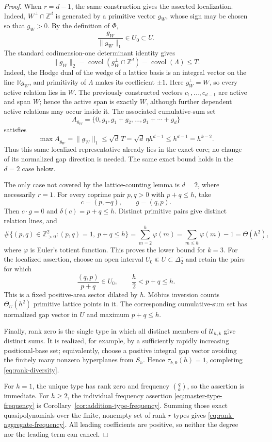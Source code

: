 \documentclass[11pt,reqno]{amsart}
\theoremstyle{definition}
\theoremstyle{remark}
\begin{document}
\begin{proof}
When $r=d-1$, the same construction gives the asserted localization.
Indeed, $W^\perp\cap\mathbb Z^d$ is generated by a primitive vector
$g_W$, whose sign may be chosen so that $g_W>0$. By the definition of
$\Phi$,
\[
 \frac{g_W}{\|g_W\|_1}\in U_0\subset U.
\]
The standard
codimension-one determinant identity gives
\[
 \|g_W\|_2
 =\operatorname{covol}(g_W^\perp\cap\mathbb Z^d)
 =\operatorname{covol}(\Lambda)\leq T.
\]
Indeed, the Hodge dual of the wedge of a lattice basis is an integral
vector on the line $\mathbb Rg_W$, and primitivity of $\Lambda$ makes its
coefficient $\pm1$.
Here $g_W^\perp=W$, so every active relation lies in $W$.  The previously
constructed vectors $c_1,\ldots,c_{d-1}$ are active and span $W$; hence the
active span is exactly $W$, although further dependent active relations may
occur inside it.  The
associated cumulative-sum set
\[
 A_{g_W}=\{0,g_1,g_1+g_2,\ldots,g_1+\cdots+g_d\}
\]
satisfies
\[
 \max A_{g_W}=\|g_W\|_1
 \leq\sqrt d\,T
 =\sqrt d\,\eta h^{d-1}\leq h^{d-1}=h^{k-2}.
\]
Thus this same localized representative already lies in the exact core; no
change of its normalized gap direction is needed.  The same exact bound
holds in the $d=2$ case below.

The only case not covered by the lattice-counting lemma is $d=2$, where
necessarily $r=1$. For every coprime pair $p,q>0$ with $p+q\leq h$, take
\[
 c=(p,-q),\qquad g=(q,p).
\]
Then $c\cdot g=0$ and $\delta(c)=p+q\leq h$. Distinct primitive pairs give
distinct relation lines, and
\[
 \#\{(p,q)\in\mathbb Z_{>0}^2:(p,q)=1,\ p+q\leq h\}
 =\sum_{m=2}^{h}\varphi(m)
 =\sum_{m\leq h}\varphi(m)-1
 =\Theta(h^2),
\]
where $\varphi$ is Euler's totient function.
This proves the lower bound for $k=3$.
For the localized assertion, choose an open interval
$U_0\Subset U\subset\Delta_2^\circ$ and retain the pairs for which
\[
 \frac{(q,p)}{p+q}\in U_0,\qquad \frac h2<p+q\leq h.
\]
This is a fixed positive-area sector dilated by $h$. M\"obius inversion
counts $\Theta_U(h^2)$ primitive lattice points in it. The corresponding
cumulative-sum set has normalized gap vector in $U$ and maximum
$p+q\leq h$.

Finally, rank zero is the single type in which all distinct members of
$\mathcal U_{h,k}$ give distinct sums. It is realized, for example, by a
sufficiently rapidly increasing positional-base set; equivalently, choose
a positive integral gap vector avoiding the finitely many nonzero
hyperplanes from $S_h$. Hence $\tau_{k,0}(h)=1$, completing
\eqref{eq:rank-diversity}.

For $h=1$, the unique type has rank zero and frequency $\binom qk$, so the
assertion is immediate.  For $h\geq2$, the individual frequency assertion
\eqref{eq:master-type-frequency} is
Corollary~\ref{cor:addition-type-frequency}. Summing those exact
quasipolynomials over the finite, nonempty set of rank-$r$ types gives
\eqref{eq:rank-aggregate-frequency}. All leading coefficients are
positive, so neither the degree nor the leading term can cancel.
\end{proof}
\end{document}
